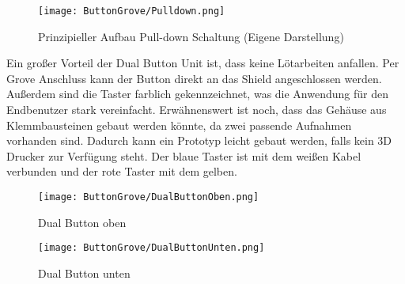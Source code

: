 \begin{figure}
    
    \begin{center}
        \texttt{[image: ButtonGrove/Pulldown.png]} 
        \caption{Prinzipieller Aufbau Pull-down Schaltung (Eigene Darstellung)} 
    \end{center}
    
\end{figure}


Ein großer Vorteil der Dual Button Unit ist, dass keine Lötarbeiten anfallen. Per Grove Anschluss kann der Button direkt an das Shield angeschlossen werden. Außerdem sind die Taster farblich gekennzeichnet, was die Anwendung für den Endbenutzer stark vereinfacht. Erwähnenswert ist noch, dass das Gehäuse aus Klemmbausteinen gebaut werden könnte, da zwei passende Aufnahmen vorhanden sind. Dadurch kann ein Prototyp leicht gebaut werden, falls kein 3D Drucker zur Verfügung steht. Der blaue Taster ist mit dem weißen Kabel verbunden und der rote Taster mit dem gelben. \cite{M5Stack:2021DualButton} 

\begin{figure}
    \begin{center}
        \texttt{[image: ButtonGrove/DualButtonOben.png]}
        \caption{Dual Button oben \cite{M5Stack:2021DualButton}}
    \end{center}
\end{figure}


\begin{figure}
    \begin{center}
        \texttt{[image: ButtonGrove/DualButtonUnten.png]}
        \caption{Dual Button unten \cite{M5Stack:2021DualButton}}
    \end{center}
\end{figure}


